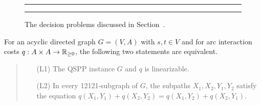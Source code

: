 \begin{figure}[tb]
\begin{center}

\bigskip
\bigskip
\end{center}
\caption{The decision problems discussed in Section~\protect{\ref{sec:hardness-chapter-4}}.}
\label{fig:problems}
\medskip
\hrule\hrule
\end{figure}

\begin{proposition}
\label{pr:HS}
For an acyclic directed graph $G=(V,A)$ with $s,t\in V$ and for arc interaction
costs $q:A\times A\to{\mathbb{R}_{\ge0}}$, the following two statements are equivalent.
\begin{quote}
\begin{itemize}
\item[(L1)] The QSPP instance $G$ and $q$ is linearizable.
\item[(L2)] In every 12121-subgraph of $G$, the subpaths $X_1,X_2,Y_1,Y_2$ satisfy the equation
$q(X_1,Y_1)+q(X_2,Y_2) = q(X_1,Y_2)+q(X_2,Y_1)$.
\end{itemize}
\end{quote}
\end{proposition}

